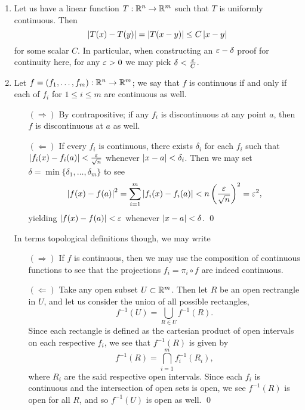 \begin{enumerate}
    \item Let us have a linear function $T : \mathbb R^n \to \mathbb R^m$ such that $T$ is uniformly continuous. Then
    \[ \left\lvert T(x) - T(y) \right\rvert = \left\lvert T(x - y) \right\rvert \leq C\left\lvert x - y \right\rvert \]
    for some scalar $C$. In particular, when constructing an $\varepsilon-\delta$ proof for continuity here, for any $\varepsilon > 0$ we may pick $\delta < \frac{\varepsilon}{C}$.

    \item Let $f = (f_1, \dots, f_m) : \mathbb R^n \to \mathbb R^m$; we say that $f$ is continuous if and only if each of $f_i$ for $1 \leq i \leq m$ are continuous as well.
    \begin{itemize}
        \item[$(\Rightarrow)$] By contrapositive; if any $f_i$ is discontinuous at any point $a$, then $f$ is discontinuous at $a$ as well.
        \item[$(\Leftarrow)$] If every $f_i$ is continuous, there exists $\delta_i$ for each $f_i$ such that $\left\lvert f_i(x) - f_i(a) \right\rvert < \frac{\varepsilon}{\sqrt{n}}$ whenever $\left\lvert x - a \right\rvert < \delta_i$. Then we may set $\delta = \min\{\delta_1, \dots, \delta_m\}$ to see
        \[ \left\lvert f(x) - f(a) \right\rvert^2 = \sum_{i=1}^m \left\lvert f_i(x) - f_i(a) \right\rvert < n \left(\frac{\varepsilon}{\sqrt{n}}\right)^2 = \varepsilon^2, \]
        yielding $\left\lvert f(x) - f(a) \right\rvert < \varepsilon$ whenever $\left\lvert x - a \right\rvert < \delta$. \qed
    \end{itemize}
    In terms topological definitions though, we may write
    \begin{itemize}
        \item[$(\Rightarrow)$] If $f$ is continuous, then we may use the composition of continuous functions to see that the projections $f_i = \pi_i \circ f$ are indeed continuous.
        \item[$(\Leftarrow)$] Take any open subset $U \subset \mathbb R^m$. Then let $R$ be an open rectrangle in $U$, and let us consider the union of all possible rectangles,
        \[ f^{-1}(U) = \bigcup_{R \in U} f^{-1}(R). \]
        Since each rectangle is defined as the cartesian product of open intervals on each respective $f_i$, we see that $f^{-1}(R)$ is given by
        \[ f^{-1}(R) = \bigcap_{i=1}^m f_i^{-1}(R_i), \]
        where $R_i$ are the said respective open intervals. Since each $f_i$ is continuous and the intersection of open sets is open, we see $f^{-1}(R)$ is open for all $R$, and so $f^{-1}(U)$ is open as well. \qed
    \end{itemize}


\end{enumerate}
